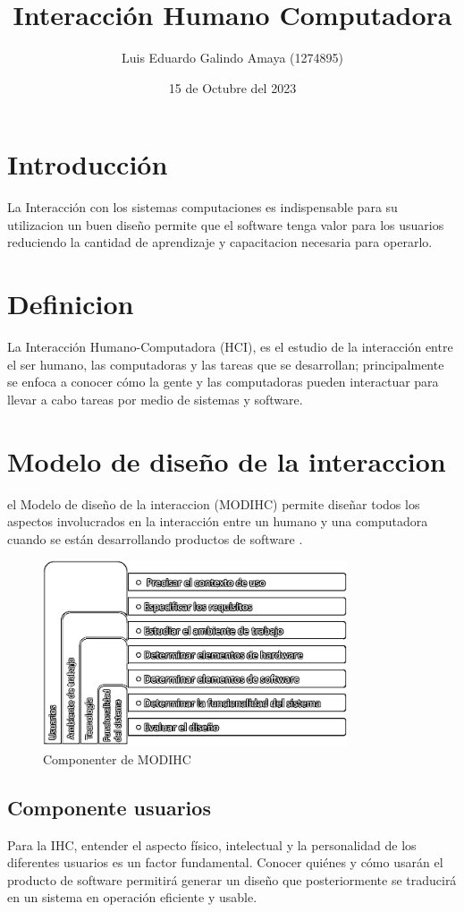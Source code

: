 \documentclass[11pt]{article}
\author{Luis Eduardo Galindo Amaya (1274895)}
\date{15 de Octubre del 2023}
\title{Interacción Humano Computadora}
\begin{document}
\tableofcontents
\pagebreak
{}


\section{Introducción}
\label{sec:orgdc697f5}
La Interacción con los sistemas computaciones es indispensable para su 
utilizacion un buen diseño permite que el software tenga valor para los 
usuarios reduciendo la cantidad de aprendizaje y capacitacion necesaria para 
operarlo.


\section{Definicion}
\label{sec:orgb43d021}
\autocite{martinez_2007} La Interacción Humano-Computadora (HCI), es el 
estudio de la interacción entre el ser humano, las computadoras y las tareas 
que se desarrollan; principalmente se enfoca a conocer cómo la gente y las
computadoras pueden interactuar para llevar a cabo tareas por medio de sistemas
y software.

\pagebreak

\section{Modelo de diseño de la interaccion}
\label{sec:org940c38c}
el Modelo de diseño de la interaccion (MODIHC) permite diseñar todos los 
aspectos involucrados en la interacción entre un humano y una computadora 
cuando se están desarrollando productos de software \autocite{martinez_2007}. 

\begin{figure}[htbp]
\centering
\includegraphics[width=9cm]{img/Design.png}
\caption{Componenter de MODIHC}
\end{figure}

\subsection{Componente usuarios}
\label{sec:orge1e9f82}
\autocite{narciso_valero_2008} Para la IHC, entender el aspecto físico, 
intelectual y la personalidad de los diferentes usuarios es un factor 
fundamental. Conocer quiénes y cómo usarán el producto de software permitirá 
generar un diseño que posteriormente se traducirá en un sistema en operación 
eficiente y usable. 
\end{document}
